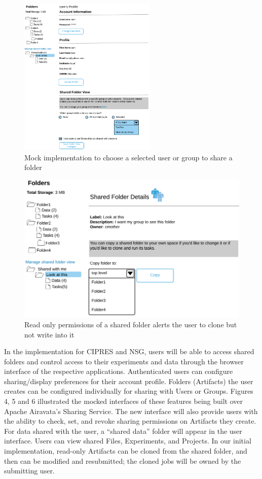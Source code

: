 \documentclass[sigconf]{acmart}
\begin{document}
\begin{figure}
\includegraphics[height=3in]{figures/cipres-mock-2.pdf}
\caption{Mock implementation to choose a selected user or group to share a folder}
\end{figure}

\begin{figure}
\includegraphics[width=\columnwidth]{figures/cipres-mock-3.pdf}
\caption{Read only permissions of a shared folder alerts the user to clone but not write into it}
\end{figure}

In the implementation for CIPRES and NSG, users will be able to access shared folders and control access to their experiments and data through the browser interface of the respective applications. Authenticated users can configure sharing/display preferences for their account profile. Folders (Artifacts) the user creates can be configured individually for sharing with Users or Groups. Figures 4, 5 and 6 illustrated the mocked interfaces of these features being built over Apache Airavata's Sharing Service. The new interface will also provide users with the ability to check, set, and revoke sharing permissions on Artifacts they create. For data shared with the user, a ``shared data'' folder will appear in the user interface. Users can view shared Files, Experiments, and Projects. In our initial implementation, read-only Artifacts can be cloned from the shared folder, and then can be modified and resubmitted; the cloned jobs will be owned by the submitting user.
\end{document}
